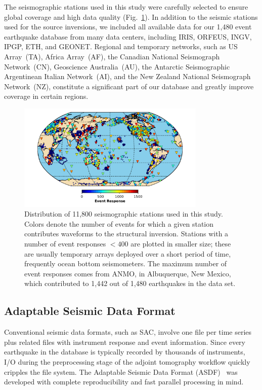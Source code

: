 \documentclass[extra,mreferee]{gji}
\begin{document}
The seismographic stations used in this study were carefully selected to ensure global coverage and high data quality (Fig.~\ref{fig:stations}).
In addition to the seismic stations used for the source inversions,
we included all available data for our 1,480 event earthquake database from many data centers,
including IRIS, ORFEUS, INGV, IPGP, ETH, and GEONET.
Regional and temporary networks,
such as US Array~(TA),
Africa Array~(AF), the Canadian National Seismograph Network~(CN), Geoscience Australia~(AU),
the Antarctic Seismographic Argentinean Italian Network~(AI),
and the New Zealand National Seismograph Network~(NZ),
constitute a significant part
of our database and greatly improve coverage in certain regions.

\begin{figure}
  \includegraphics[width=0.8\textwidth]{figures/station_map.pdf}
  \caption{Distribution of 11,800 seismographic stations used in this study. Colors denote the number of events for which a given station contributes waveforms to the structural inversion. Stations with a number of event responses $<400$ are plotted in smaller size; these are usually temporary arrays deployed over a short period of time, frequently ocean bottom seismometers. The maximum number of event responses comes from ANMO, in Albuquerque, New Mexico, which contributed to 1,442 out of 1,480 earthquakes in the data set.}
  \label{fig:stations}
  \centering
\end{figure}

\subsection{Adaptable Seismic Data Format}
\label{section:ASDF}

Conventional seismic data formats, such as SAC, involve one file per time series plus related files with instrument response and event information.
Since every earthquake in the database is typically recorded by thousands of instruments, I/O during the preprocessing stage of the adjoint tomography workflow quickly cripples the file system.
The Adaptable Seismic Data Format (ASDF)~\citep[][ \texttt{https://seismic-data.org/ }]{krischer2016adaptable} was developed with complete reproducibility and fast parallel processing in mind.
\end{document}
